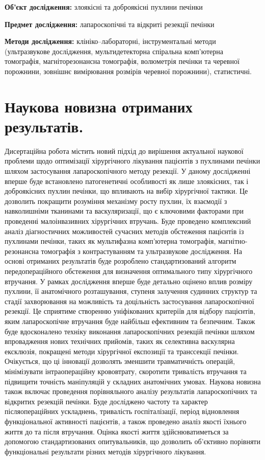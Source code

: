 \textbf{Об’єкт дослідження:} злоякісні та доброякісні пухлини печінки

\textbf{Предмет дослідження:} лапароскопічні та відкриті резекції печінки


\textbf{Методи дослідження:} клініко–лабораторні, інструментальні методи (ультразвукове дослідження, мультидетекторна спіральна комп’ютерна томографія, магніторезонансна томографія, волюметрія печінки та черевної порожнини, зовнішнє вимірювання розмірів черевної порожнини), статистичні.


\section{Наукова новизна отриманих результатів.} 

Дисертаційна робота містить новий підхід до вирішення актуальної наукової проблеми щодо оптимізації хірургічного лікування пацієнтів з пухлинами печінки шляхом застосування лапароскопічного методу резекції. У даному дослідженні вперше буде встановлено патогенетичні особливості як лише злоякісних, так і доброякісних пухлин печінки, що впливають на вибір хірургічної тактики. Це дозволить покращити розуміння механізму росту пухлин, їх взаємодії з навколишніми тканинами та васкуляризації, що є ключовими факторами при проведенні малоінвазивних хірургічних втручань.
Буде проведено комплексний аналіз діагностичних можливостей сучасних методів обстеження пацієнтів із пухлинами печінки, таких як мультифазна комп’ютерна томографія, магнітно-резонансна томографія з контрастуванням та ультразвукове дослідження. На основі отриманих результатів буде розроблено стандартизований алгоритм передопераційного обстеження для визначення оптимального типу хірургічного втручання.
У рамках дослідження вперше буде детально оцінено вплив розміру пухлини, її анатомічного розташування, ступеня залучення судинних структур та стадії захворювання на можливість та доцільність застосування лапароскопічної резекції. Це сприятиме створенню уніфікованих критеріїв для відбору пацієнтів, яким лапароскопічне втручання буде найбільш ефективним та безпечним.
Також буде вдосконалено техніку виконання лапароскопічних резекцій печінки шляхом впровадження нових технічних прийомів, таких як селективна васкулярна ексклюзія, покращені методи хірургічної експозиції та транссекції печінки. Очікується, що ці інновації дозволять зменшити травматичність операцій, мінімізувати інтраопераційну крововтрату, скоротити тривалість втручання та підвищити точність маніпуляцій у складних анатомічних умовах.
Наукова новизна також включає проведення порівняльного аналізу результатів лапароскопічних та відкритих резекцій печінки. Буде досліджено частоту та характер післяопераційних ускладнень, тривалість госпіталізації, період відновлення функціональної активності пацієнтів, а також проведено аналіз якості їхнього життя до та після втручання. Оцінка якості життя здійснюватиметься за допомогою стандартизованих опитувальників, що дозволить об’єктивно порівняти функціональні результати різних методів хірургічного лікування.
